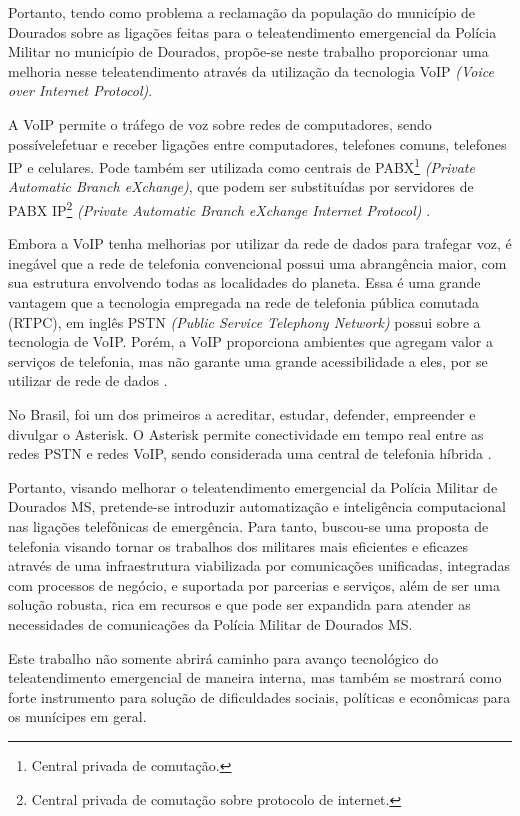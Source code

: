 Portanto, tendo como problema a reclamação da população do município de Dourados sobre as ligações feitas para o teleatendimento emergencial da Polícia Militar no município de Dourados, propõe-se neste trabalho proporcionar uma melhoria nesse teleatendimento através da utilização da tecnologia VoIP \textit{(Voice over Internet Protocol)}. 

A VoIP permite o tráfego de voz sobre redes de computadores, sendo possívelefetuar e receber ligações entre computadores, telefones comuns, telefones IP e celulares. Pode também ser utilizada como centrais de PABX\footnote{Central privada de comutação.} \textit{(Private Automatic Branch eXchange)}, que podem ser substituídas por servidores de PABX IP\footnote{Central privada de comutação sobre protocolo de internet.} \textit{(Private Automatic Branch eXchange Internet Protocol)} \cite{glauciadasilvaribeiro2011}.

Embora a VoIP tenha melhorias por utilizar da rede de dados para trafegar voz, é inegável que a rede de telefonia convencional possui uma abrangência maior, com sua estrutura envolvendo todas as localidades do planeta. Essa é uma grande vantagem que a tecnologia empregada na rede de telefonia pública comutada (RTPC), em inglês PSTN \textit{(Public Service Telephony Network)} possui sobre a tecnologia de VoIP. Porém, a VoIP proporciona ambientes que agregam valor a serviços de telefonia, mas não garante uma grande acessibilidade a eles, por se utilizar de rede de dados \cite{theodorewallingford2005}.

No Brasil,  foi um dos primeiros a acreditar, estudar, defender, empreender e divulgar o Asterisk. O Asterisk permite conectividade em tempo real entre as redes PSTN e redes VoIP, sendo considerada uma central de telefonia híbrida \cite{alexandrekeller2014}.

Portanto, visando melhorar o teleatendimento emergencial da Polícia Militar de Dourados MS, pretende-se introduzir automatização e inteligência computacional nas ligações telefônicas de emergência. Para tanto, buscou-se uma proposta de telefonia visando tornar os trabalhos dos militares mais eficientes e eficazes através de uma infraestrutura viabilizada por comunicações unificadas, integradas com processos de negócio, e suportada por parcerias e serviços, além de ser uma solução robusta, rica em recursos e que pode ser expandida para atender as necessidades de comunicações da Polícia Militar de Dourados MS.

Este trabalho não somente abrirá caminho para avanço tecnológico do teleatendimento emergencial de maneira interna, mas também se mostrará como forte instrumento para solução de dificuldades sociais, políticas e econômicas para os munícipes em geral.

